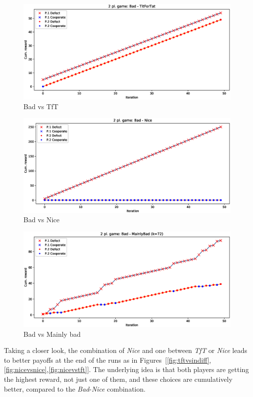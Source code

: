 \documentclass[journal,10pt,twoside]{IEEEtran}
\begin{document}
\begin{figure}[!ht]
    \centering
    \includegraphics[width=.9\columnwidth]{../img/ipd2p/ipd2p-rewards-Bad-TitForTat}
    \caption{Bad vs TfT}
    \label{fig:badvstft}
\end{figure}

\begin{figure}[!ht]
    \centering
    \includegraphics[width=.9\columnwidth]{../img/ipd2p/ipd2p-rewards-Bad-Nice}
    \caption{Bad vs Nice}
    \label{fig:badvsnice}
\end{figure}

\begin{figure}[!ht]
    \centering
    \includegraphics[width=.9\columnwidth]{../img/ipd2p/ipd2p-rewards-Bad-MainlyBad(k=72)}
    \caption{Bad vs Mainly bad}
    \label{fig:badvsmainlybad}
\end{figure}

Taking a closer look, the combination of \textit{Nice} and one between \textit{TfT} or \textit{Nice} leads to better payoffs at the end of the runs as in Figures~[\ref{fig:tftvsindiff},\ref{fig:nicevsnice},\ref{fig:nicevstft}]. The underlying idea is that both players are getting the highest reward, not just one of them, and these choices are cumulatively better, compared to the \textit{Bad}-\textit{Nice} combination.
\end{document}
